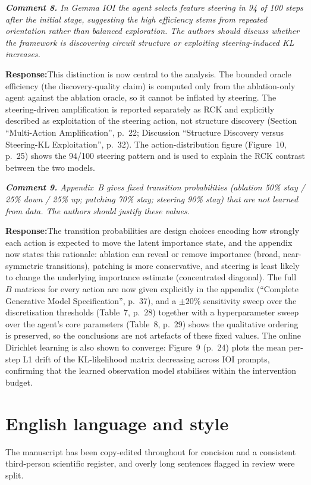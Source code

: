 \documentclass[11pt]{article}
\newenvironment{comment}{%
  \def\FrameCommand{{\color{commentrule}\vrule width 3pt}\hspace{0pt}%
    \fboxsep=8pt\colorbox{commentbg}}%
  \MakeFramed{\advance\hsize-\width\FrameRestore}%
  \itshape\small}{\endMakeFramed}
\newcommand{\reviewerpoint}[1]{\medskip\noindent\textbf{Comment #1.}\;}
\newcommand{\response}{\par\smallskip\noindent\textbf{Response:}\;}
\begin{document}
\begin{comment}
\reviewerpoint{8} In Gemma IOI the agent selects feature steering in 94 of 100
steps after the initial stage, suggesting the high efficiency stems from repeated
orientation rather than balanced exploration. The authors should discuss whether
the framework is discovering circuit structure or exploiting steering-induced KL
increases.
\end{comment}
\response This distinction is now central to the analysis. The bounded oracle
efficiency (the discovery-quality claim) is computed only from the ablation-only
agent against the ablation oracle, so it cannot be inflated by steering. The
steering-driven amplification is reported separately as RCK and explicitly
described as exploitation of the steering action, not structure discovery
(Section ``Multi-Action Amplification'', p.~22; Discussion ``Structure Discovery
versus Steering-KL Exploitation'', p.~32). The action-distribution figure
(Figure~10, p.~25) shows the 94/100 steering pattern and is used to explain the
RCK contrast between the two models.

\begin{comment}
\reviewerpoint{9} Appendix~B gives fixed transition probabilities (ablation 50\%
stay / 25\% down / 25\% up; patching 70\% stay; steering 90\% stay) that are not
learned from data. The authors should justify these values.
\end{comment}
\response The transition probabilities are design choices encoding how strongly
each action is expected to move the latent importance state, and the appendix now
states this rationale: ablation can reveal or remove importance (broad, near-
symmetric transitions), patching is more conservative, and steering is least
likely to change the underlying importance estimate (concentrated diagonal). The
full $B$ matrices for every action are now given explicitly in the appendix
(``Complete Generative Model Specification'', p.~37), and a $\pm 20\%$ sensitivity
sweep over the discretisation thresholds (Table~7, p.~28) together with a
hyperparameter sweep over the agent's core parameters (Table~8, p.~29) shows the
qualitative ordering is preserved, so the conclusions are not artefacts of these
fixed values. The online Dirichlet learning is also shown to converge: Figure~9
(p.~24) plots the mean per-step L1 drift of the KL-likelihood matrix decreasing
across IOI prompts, confirming that the learned observation model stabilises
within the intervention budget.

\section*{English language and style}
The manuscript has been copy-edited throughout for concision and a consistent
third-person scientific register, and overly long sentences flagged in review
were split.
\end{document}
